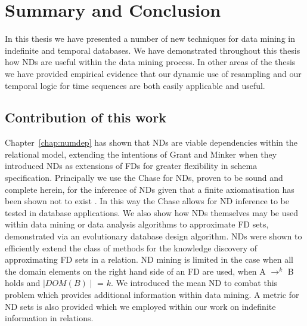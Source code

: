 \chapter{Summary and Conclusion}\label{chap:conclusion}

In this thesis we have presented a number of new techniques for data
mining in indefinite and temporal databases. We have demonstrated
throughout this thesis how NDs are useful within the data mining
process. In other areas of the thesis we have provided empirical
evidence that our dynamic use of resampling and our temporal logic for
time sequences are both easily applicable and useful. 

\section{Contribution of this work}\label{sec:conc_contrib}

Chapter~\ref{chap:numdep} has shown that NDs are viable dependencies
within the relational model, extending the intentions of Grant and Minker
\cite{gm85b,gm85a} when they introduced NDs as extensions of FDs for
greater flexibility in schema specification. Principally we use the
Chase for NDs, proven to be sound and complete herein, for the
inference of NDs given that a finite axiomatisation has been shown not
to exist \cite{gm85b}. In this way the Chase allows for ND inference
to be tested in database applications. We also show how NDs themselves
may be used within data mining or data analysis algorithms to
approximate FD sets, demonstrated via an evolutionary database design
algorithm. NDs were shown to efficiently extend the class of methods for the
knowledge discovery of approximating FD sets in a relation. ND mining
is limited in the case when all the domain elements on the right hand
side of an FD are used, when A $\to^k$ B holds and $\mid DOM(B) \mid$ =
$k$. We introduced the mean ND to combat this problem which provides
additional information within data mining. A metric for ND sets is
also provided which we employed within our work on indefinite
information in relations.

\medskip

